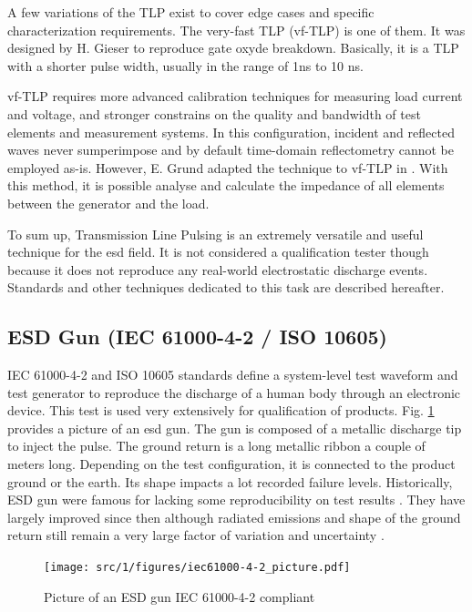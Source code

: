 A few variations of the TLP exist to cover edge cases and specific characterization requirements.
The very-fast \gls{TLP} (vf-TLP) is one of them.
It was designed by H. Gieser \cite{vf-tlp} to reproduce gate oxyde breakdown.
Basically, it is a TLP with a shorter pulse width, usually in the range of 1ns to 10 ns.

vf-TLP requires more advanced calibration techniques for measuring load current and voltage, and stronger constrains on the quality and bandwidth of test elements and measurement systems.
In this configuration, incident and reflected waves never sumperimpose and by default time-domain reflectometry cannot be employed as-is.
However, E. Grund adapted the technique to vf-TLP in \cite{vf-tlp-tdr}.
With this method, it is possible analyse and calculate the impedance of all elements between the generator and the load.

To sum up, Transmission Line Pulsing is an extremely versatile and useful technique for the \gls{esd} field.
It is not considered a qualification tester though because it does not reproduce any real-world electrostatic discharge events.
Standards and other techniques dedicated to this task are described hereafter.

\subsection{ESD Gun (IEC 61000-4-2 / ISO 10605)}

IEC 61000-4-2 \cite{iec61000-4-2} and ISO 10605 \cite{iso10605} standards define a system-level test waveform and test generator to reproduce the discharge of a human body through an electronic device.
This test is used very extensively for qualification of products.
Fig. \ref{fig:picture-esd-gun} provides a picture of an \gls{esd} gun.
The gun is composed of a metallic discharge tip to inject the pulse.
The ground return is a long metallic ribbon a couple of meters long.
Depending on the test configuration, it is connected to the product ground or the earth.
Its shape impacts a lot recorded failure levels.
Historically, ESD gun were famous for lacking some reproducibility on test results \cite{hmm-uncertainty}.
They have largely improved since then although radiated emissions and shape of the ground return still remain a very large factor of variation and uncertainty \cite{gun-rf-uncertainty}.

\begin{figure}[!h]
  \centering
  \texttt{[image: src/1/figures/iec61000-4-2\_picture.pdf]}
  \caption{Picture of an ESD gun IEC 61000-4-2 compliant}
  \label{fig:picture-esd-gun}
\end{figure}

